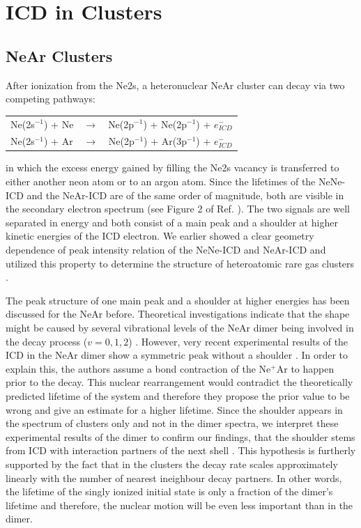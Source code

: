 \section{ICD in Clusters}
\label{sec:clusters}

\subsection{NeAr Clusters}
\label{sec:near}
After ionization from the Ne2s, a heteronuclear NeAr cluster can decay
via two competing pathways:

\begin{center}
\begin{tabular}{lcr}
 Ne(2s$^{-1}$) + Ne &$\rightarrow$ & Ne(2p$^{-1}$) + Ne(2p$^{-1}$) + $e^-_{ICD}$\\
 Ne(2s$^{-1}$) + Ar &$\rightarrow$ & Ne(2p$^{-1}$) + Ar(3p$^{-1}$) + $e^-_{ICD}$
\end{tabular}
\end{center}

in which the excess energy gained by filling the Ne2s vacancy is transferred to
either another neon atom or to an argon atom. Since the lifetimes of the
NeNe-ICD and the NeAr-ICD are of the same order of magnitude, both are
visible in the secondary electron spectrum (see Figure 2 of
Ref. \cite{Fasshauer14_1}). The two signals are well separated in energy
and both consist of a main peak and a shoulder at higher kinetic energies
of the ICD electron.
We earlier showed a clear
geometry dependence of peak intensity relation of the NeNe-ICD and NeAr-ICD
and utilized this property to determine the structure of
heteroatomic rare gas clusters \cite{Fasshauer14_1}.

The peak structure of one main peak and a shoulder at higher energies has been
discussed for the NeAr before. Theoretical investigations indicate that the
shape might be caused by several vibrational levels of the NeAr dimer
being involved in the decay process ($v=0,1,2$) \cite{Scheit06}. However, very
recent experimental results of the ICD in the NeAr dimer show a symmetric peak
without a shoulder \cite{OKeeffe14}. In order to explain this, the authors assume
a bond contraction of the Ne$^+$Ar to happen prior to the decay.
This nuclear rearrangement would contradict the
theoretically predicted lifetime of the system and therefore they propose
the prior value to be wrong and give an estimate for a higher lifetime.
Since the shoulder appears in the spectrum of clusters only and not in the
dimer spectra, we interpret these experimental results of the dimer to confirm our
findings, that the shoulder stems from ICD with interaction partners of the
next shell \cite{Fasshauer14_1}. This hypothesis is furtherly supported by the
fact that
in the clusters the decay rate scales approximately linearly
with the number of nearest ineighbour decay partners.
In other words, the lifetime of the
singly ionized initial state is only a fraction of the dimer's lifetime and
therefore, the nuclear motion will be even less important than in the dimer.

